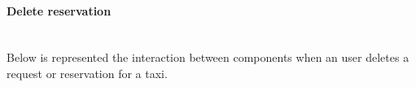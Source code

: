 \documentclass[a4paper,11pt]{report} %
\begin{document}
	\paragraph{Delete reservation} \mbox{}\\
	Below is represented the interaction between components when an user deletes a request or reservation for a taxi.	\\
		\begin{minipage}{\linewidth}
		\end{minipage}	
		
	\pagebreak	
\end{document}
